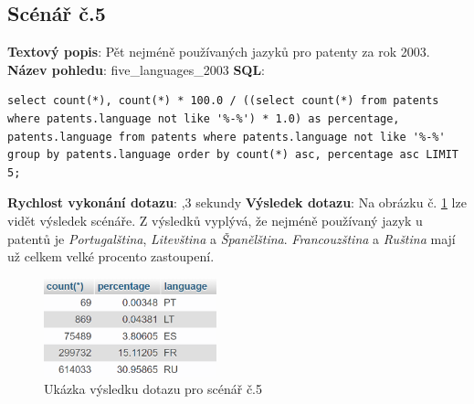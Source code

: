 \subsection{Scénář č.5}
\textbf{Textový popis}: Pět nejméně používaných jazyků pro patenty za rok 2003.
\newline
\textbf{Název pohledu}: five\_languages\_2003
\newline
\textbf{SQL}: 
\begin{lstlisting}[label = {lst:elements_a}]
select count(*), count(*) * 100.0 / ((select count(*) from patents where patents.language not like '%-%') * 1.0) as percentage, patents.language from patents where patents.language not like '%-%' group by patents.language order by count(*) asc, percentage asc LIMIT 5;
\end{lstlisting}
\textbf{Rychlost vykonání dotazu}: ,3 sekundy
\newline
\textbf{Výsledek dotazu}: Na obrázku č. \ref{fig:scenar5} lze vidět výsledek scénáře. Z výsledků vyplývá, že nejméně používaný jazyk u patentů je \textit{Portugalština}, \textit{Litevština} a \textit{Španělština}. \textit{Francouzština} a \textit{Ruština} mají už celkem velké procento zastoupení.
\begin{figure}[H]
\centering
\includegraphics[width=5cm]{img/scenare/scenar_5}
\caption{Ukázka výsledku dotazu pro scénář č.5}
\label{fig:scenar5}
\end{figure}

\newpage
